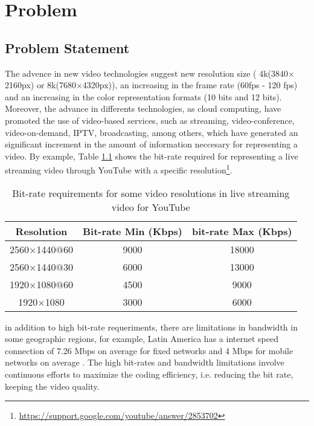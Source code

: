 \chapter{Problem}
\label{chap:problem}

\section{Problem Statement}

The advence in new video technologies suggest new resolution size (
4k(3840$\times$2160px) or 8k(7680$\times$4320px)), an increasing in the frame
rate (60fps - 120 fps) and an increasing in the  color representation formats
(10 bits and 12 bits). Moreover, the advance in differents technologies, as
cloud computing, have promoted the use of video-based services, such as 
streaming, video-conference, video-on-demand, IPTV, broadcasting, among others,
which have generated an significant increment in the amount of information
neccesary for representing a video. By example, Table \ref{fig:youtube} shows
the bit-rate required for representing a live streaming video through YouTube
with a specific resolution\footnote{\url{https://support.google.com/youtube/answer/2853702}}.

\begin{table}[!h]
\centering
\begin{tabular}{|c|c|c|}
\hline
\textbf{Resolution} & \textbf{Bit-rate Min (Kbps)} & \textbf{bit-rate Max (Kbps)} \\
\hline
2560$\times$1440$@$60 & 9000 & 18000 \\
\hline
2560$\times$1440$@$30 &  6000 & 13000  \\
\hline
1920$\times$1080$@$60 & 4500 & 9000\\
\hline
1920$\times$1080 & 3000 & 6000 \\
\hline
\end{tabular}
\caption{Bit-rate requirements for some video resolutions in live
streaming video for YouTube}
\label{fig:youtube}
\end{table}

in addition to high bit-rate requeriments, there are limitations in bandwidth in
some geographic regions, for example, Latin America has a internet speed
connection of 7.26 Mbps on average for fixed networks and 4 Mbps for mobile
networks on average \cite{cepal}. The high bit-rates and bandwidth limitations
involve continuous efforts to maximize the coding efficiency, i.e. reducing the
bit rate, keeping the video quality.

